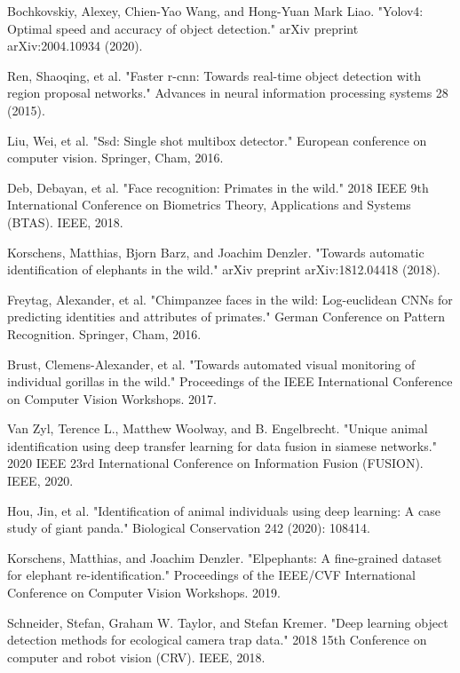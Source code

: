 \documentclass[10pt,twocolumn,letterpaper]{article}
\begin{document}
\begin{thebibliography}{99}

	Bochkovskiy, Alexey, Chien-Yao Wang, and Hong-Yuan Mark Liao. "Yolov4: Optimal speed and accuracy of object detection." arXiv preprint arXiv:2004.10934 (2020).
	
	Ren, Shaoqing, et al. "Faster r-cnn: Towards real-time object detection with region proposal networks." Advances in neural information processing systems 28 (2015).
	

	Liu, Wei, et al. "Ssd: Single shot multibox detector." European conference on computer vision. Springer, Cham, 2016.


	Deb, Debayan, et al. "Face recognition: Primates in the wild." 2018 IEEE 9th International Conference on Biometrics Theory, Applications and Systems (BTAS). IEEE, 2018. 


	Korschens, Matthias, Bjorn Barz, and Joachim Denzler. "Towards automatic identification of elephants in the wild." arXiv preprint arXiv:1812.04418 (2018). 


	Freytag, Alexander, et al. "Chimpanzee faces in the wild: Log-euclidean CNNs for predicting identities and attributes of primates." German Conference on Pattern Recognition. Springer, Cham, 2016. 


	Brust, Clemens-Alexander, et al. "Towards automated visual monitoring of individual gorillas in the wild." Proceedings of the IEEE International Conference on Computer Vision Workshops. 2017. 


	Van Zyl, Terence L., Matthew Woolway, and B. Engelbrecht. "Unique animal identification using deep transfer learning for data fusion in siamese networks." 2020 IEEE 23rd International Conference on Information Fusion (FUSION). IEEE, 2020. 


	Hou, Jin, et al. "Identification of animal individuals using deep learning: A case study of giant panda." Biological Conservation 242 (2020): 108414. 


	Korschens, Matthias, and Joachim Denzler. "Elpephants: A fine-grained dataset for elephant re-identification." Proceedings of the IEEE/CVF International Conference on Computer Vision Workshops. 2019. 




	Schneider, Stefan, Graham W. Taylor, and Stefan Kremer. "Deep learning object detection methods for ecological camera trap data." 2018 15th Conference on computer and robot vision (CRV). IEEE, 2018.




\end{thebibliography}
\end{document}
